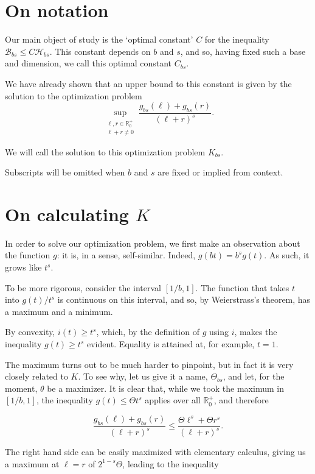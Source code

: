 \documentclass[11pt, reqno]{amsart}
\newcommand{\R}{\mathbb{R}}
\newcommand{\HH}{\mathcal{H}}
\newcommand{\BB}{\mathcal{B}}
\begin{document}
\section{On notation}

Our main object of study is the `optimal constant' $C$ for the inequality $\BB_{bs} \leq C \HH_{bs}$. This constant depends on $b$ and $s$, and so, having fixed such a base and dimension, we call this optimal constant $C_{bs}$.

We have already shown that an upper bound to this constant is given by the solution to the optimization problem
\[ \sup_{\substack{\ell,r \in \R^+_0\\\ell+r \neq 0}} \frac{g_{bs}(\ell) + g_{bs}(r)}{(\ell + r)^s}.\]

We will call the solution to this optimization problem $K_{bs}$.

Subscripts will be omitted when $b$ and $s$ are fixed or implied from context.

\section{On calculating $K$} \label{calck}

In order to solve our optimization problem, we first make an observation about the function $g$: it is, in a sense, self-similar. Indeed, $g(b t) = b^s g(t)$. As such, it grows like $t^s$.

To be more rigorous, consider the interval $\left[ 1/b, 1 \right]$. The function that takes $t$ into $g(t)/t^s$ is continuous on this interval, and so, by Weierstrass's theorem, has a maximum and a minimum.

By convexity, $i(t) \geq t^s$, which, by the definition of $g$ using $i$, makes the inequality $g(t) \geq t^s$ evident. Equality is attained at, for example, $t = 1$.

The maximum turns out to be much harder to pinpoint, but in fact it is very closely related to $K$. To see why, let us give it a name, $\Theta_{bs}$, and let, for the moment, $\theta$ be a maximizer. It is clear that, while we took the maximum in $\left[ 1/b, 1 \right]$, the inequality $g(t) \leq \Theta t^s$ applies over all $\R^+_0$, and therefore

\[\frac{g_{bs}(\ell) + g_{bs}(r)}{(\ell + r)^s} \leq \frac{\Theta \ell^s + \Theta r^s}{(\ell+r)^s}.\]

The right hand side can be easily maximized with elementary calculus, giving us a maximum at $\ell = r$ of $2^{1-s} \Theta$, leading to the inequality
\end{document}
